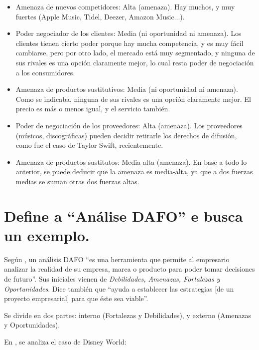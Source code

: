 \documentclass[a4paper]{article}
\begin{document}
\begin{itemize}
    \item Amenaza de nuevos competidores: Alta (amenaza). Hay muchos, y muy fuertes (Apple Music, Tidel, Deezer, Amazon Music...).
    \item Poder negociador de los clientes: Media (ni oportunidad ni amenaza). Los clientes tienen cierto poder porque hay mucha competencia, y es muy fácil cambiarse, pero por otro lado, el mercado está muy segmentado, y ninguna de sus rivales es una opción claramente mejor, lo cual resta poder de negociación a los consumidores.
    \item Amenaza de productos sustitutivos: Media (ni oportunidad ni amenaza). Como se indicaba, ninguna de sus rivales es una opción claramente mejor. El precio es más o menos igual, y el servicio también.
    \item Poder de negociación de los proveedores: Alta (amenaza). Los proveedores (músicos, discográficas) pueden decidir retirarle los derechos de difusión, como fue el caso de Taylor Swift, recientemente.
    \item Amenaza de productos sustitutos: Media-alta (amenaza). En base a todo lo anterior, se puede deducir que la amenaza es media-alta, ya que a dos fuerzas medias se suman otras dos fuerzas altas.
\end{itemize}

\section{Define a ``Análise DAFO'' e busca un exemplo.}

Según \cite{RefWorks:doc:602fb92d8f085533dc6835e1}, un análisis DAFO ``es una herramienta que permite al empresario analizar la realidad de su empresa, marca o producto para poder tomar decisiones de futuro''. Sus iniciales vienen de \textit{Debilidades, Amenazas, Fortalezas y Oportunidades}. Dice también que ``ayuda a establecer las estrategias [de un proyecto empresarial] para que éste sea viable''.

Se divide en dos partes: interno (Fortalezas y Debilidades), y externo (Amenazas y Oportunidades).

En \cite{RefWorks:doc:602fca5f8f085e432d8613ac}, se analiza el caso de Disney World:
\end{document}
